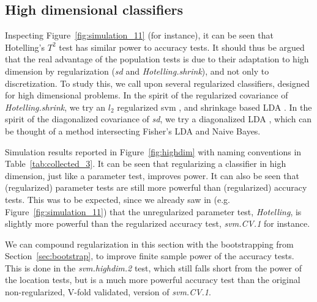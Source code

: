 \documentclass[12pt,a4paper]{article}
\theoremstyle{definition}
\begin{document}
\subsection{High dimensional classifiers}
Inspecting Figure~\ref{fig:simulation_11} (for instance), it can be seen that Hotelling's $T^2$ test has similar power to accuracy tests. 
It should thus be argued that the real advantage of the population tests is due to their adaptation to high dimension by regularization (\emph{sd} and \emph{Hotelling.shrink}), and not only to discretization.
To study this, we call upon several regularized classifiers, designed for high dimensional problems. 
In the spirit of the regularized covariance of \emph{Hotelling.shrink}, we try an $l_2$ regularized svm \cite{friedman_regularization_2010}, and shrinkage based LDA \citep{pang_shrinkage-based_2009,ramey_high-dimensional_2016}. %
In the spirit of the diagonalized covariance of \emph{sd}, we try a diagonalized LDA \citep{dudoit_comparison_2002}, which can be thought of a method intersecting Fisher's LDA and Naive Bayes. 


Simulation results reported in Figure~\ref{fig:highdim} with naming conventions in Table~\ref{tab:collected_3}.
It can be seen that regularizing a classifier in high dimension, just like a parameter test, improves power. 
It can also be seen that (regularized) parameter tests are still more powerful than (regularized) accuracy tests. 
This was to be expected, since we already saw in (e.g. Figure~\ref{fig:simulation_11}) that the unregularized parameter test, \emph{Hotelling}, is slightly more powerful than the regularized accuracy test, \emph{svm.CV.1} for instance.

We can compound regularization in this section with the bootstrapping from Section~\ref{sec:bootstrap}, to improve finite sample power of the accuracy tests. 
This is done in the \emph{svm.highdim.2} test, which still falls short from the power of the location tests, but is a much more powerful accuracy test than the original non-regularized, V-fold validated, version of \emph{svm.CV.1}.

\bigskip
\end{document}
